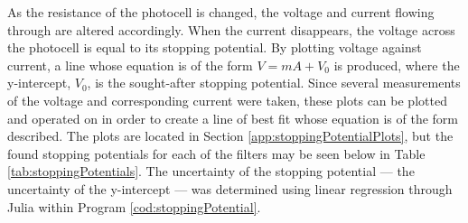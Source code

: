 \documentclass[a4paper]{article}
\begin{document}

\qq As the resistance of the photocell is changed, the voltage and current
flowing through are altered accordingly. When the current disappears, the
voltage across the photocell is equal to its stopping potential. By plotting
voltage against current, a line whose equation is of the form \( V = mA + V_0 \)
is produced, where the y-intercept, \( V_0 \), is the sought-after stopping
potential. Since several measurements of the voltage and corresponding current
were taken, these plots can be plotted and operated on in order to create a line
of best fit whose equation is of the form described. The plots are located in
Section \ref{app:stoppingPotentialPlots}, but the found stopping potentials for
each of the filters may be seen below in Table \ref{tab:stoppingPotentials}. The
uncertainty of the stopping potential --- the uncertainty of the y-intercept ---
was determined using linear regression through Julia within Program
\ref{cod:stoppingPotential}.
\end{document}
